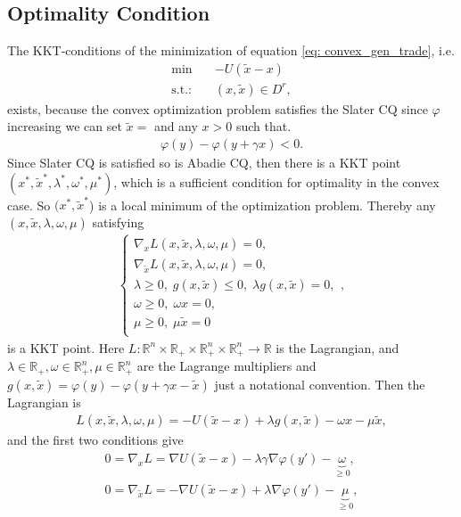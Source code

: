 \subsection{Optimality Condition\label{sec: optimality condition}}
The KKT-conditions of the minimization of
equation \ref{eq: convex_gen_trade}, i.e.
\begin{align}
    \text{min} \quad &-U(\tilde{x}-x)\\
    \text{s.t.:}\quad & (x,\tilde{x}) \in D^{r},
\end{align}
exists, because the convex optimization problem satisfies the Slater CQ since
$\varphi$ increasing we can set $\tilde{x}=$ and any $x>0$ such that. \begin{align}
    \varphi(y) - \varphi(y + \gamma x) < 0.
\end{align}
Since Slater CQ is satisfied so is Abadie CQ, then there is a KKT point
$(x^{*} , \tilde{x}^{*}, \lambda^{*} , \omega^{*} , \mu^{*} )$, which is a
sufficient condition for optimality in the convex case. So $(x^{*} ,
\tilde{x}^{*}$) is a local minimum of the optimization problem.
Thereby any $(x, \tilde{x}, \lambda, \omega, \mu)$ satisfying
\begin{align}
    \begin{cases}
    \nabla_x L(x, \tilde{x}, \lambda, \omega, \mu) = 0,\\
    \nabla_{\tilde{x}} L(x, \tilde{x}, \lambda, \omega, \mu) = 0,\\
    \lambda \ge 0,\; g(x, \tilde{x}) \le 0,\; \lambda g(x, \tilde{x}) = 0,\\
    \omega \ge 0,\; \omega x = 0,\\
    \mu \ge 0,\; \mu \tilde{x} = 0\\
    \end{cases},
\end{align}
is a KKT point.
Here $L:
\mathbb{R}^{n}\times\mathbb{R}_+\times\mathbb{R}_+^{n}\times\mathbb{R}_+^{n}
\to \mathbb{R} $ is the Lagrangian, and $\lambda \in \mathbb{R}_+, \omega \in
\mathbb{R}_+^{n}, \mu \in \mathbb{R}_+^{n}$  are the Lagrange multipliers and
$g(x, \tilde{x}) = \varphi(y) - \varphi(y + \gamma x - \tilde{x})$ just a
notational convention. Then the Lagrangian is
\begin{align}
    L(x, \tilde{x},\lambda, \omega, \mu) = -U(\tilde{x}-x) + \lambda g(x,
    \tilde{x}) - \omega x - \mu \tilde{x},
\end{align}
and the first two conditions give
\begin{align}
    0 = \nabla_x L = \nabla U(\tilde{x}-x) - \lambda \gamma \nabla\varphi(y') -
    \underbrace{\omega}_{\ge0},\\
    0 = \nabla_{\tilde{x}} L = - \nabla U(\tilde{x}-x) + \lambda  \nabla\varphi(y') -
    \underbrace{\mu}_{\ge0},
\end{align}
